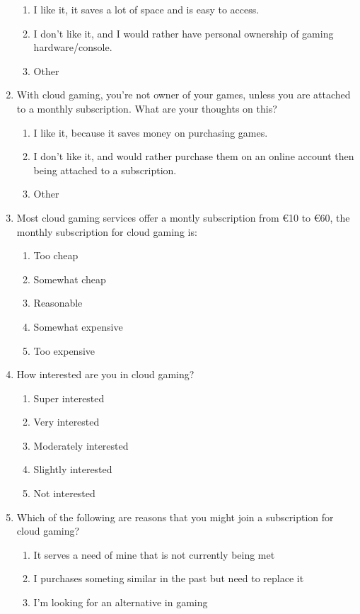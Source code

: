 \begin{enumerate}
	\begin{enumerate}
		\item I like it, it saves a lot of space and is easy to access.
		\item I don't like it, and I would rather have personal ownership of gaming hardware/console.
		\item Other
	\end{enumerate}
	\item With cloud gaming, you're not owner of your games, unless you are attached to a monthly subscription. What are your thoughts on this?
	\begin{enumerate}
		\item I like it, because it saves money on purchasing games.
		\item I don't like it, and would rather purchase them on an online account then being attached to a subscription.
		\item Other
	\end{enumerate}
	\item Most cloud gaming services offer a montly subscription from €10 to €60, the monthly subscription for cloud gaming is:
	\begin{enumerate}
		\item Too cheap
		\item Somewhat cheap
		\item Reasonable
		\item Somewhat expensive
		\item Too expensive
	\end{enumerate}
	\item How interested are you in cloud gaming?
	\begin{enumerate}
		\item Super interested
		\item Very interested
		\item Moderately interested
		\item Slightly interested
		\item Not interested
	\end{enumerate}
	\item Which of the following are reasons that you might join a subscription for cloud gaming?
	\begin{enumerate}
		\item It serves a need of mine that is not currently being met
		\item I purchases someting similar in the past but need to replace it
		\item I'm looking for an alternative in gaming

\end{enumerate}
\end{enumerate}
